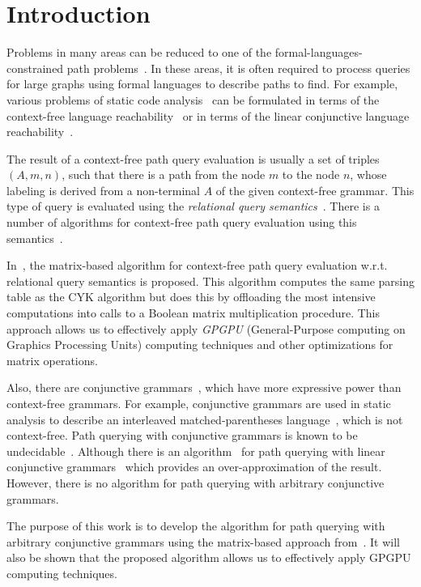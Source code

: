 \section{Introduction}

Problems in many areas can be reduced to one of the formal-languages-constrained path problems~\cite{barrett2000formal}. In these areas, it is often required to process queries for large graphs using formal languages to describe paths to find. For example, various problems of static code analysis~\cite{bastani2015specification,xu2009scaling} can be formulated in terms of the context-free language reachability~\cite{reps1998program} or in terms of the linear conjunctive language reachability~\cite{zhang2017context}.

The result of a context-free path query evaluation is usually a set of triples \mbox{$(A, m, n)$}, such that there is a path from the node $m$ to the node $n$, whose labeling is derived from a non-terminal $A$ of the given context-free grammar. This type of query is evaluated using the \emph{relational query semantics}~\cite{hellingsRelational}. There is a number of algorithms for context-free path query evaluation using this semantics~\cite{azimov2018context,GLL,hellingsRelational,GraphQueryWithEarley,RDF}.

In~\cite{azimov2018context}, the matrix-based algorithm for context-free path query evaluation w.r.t. relational query semantics is proposed. This algorithm computes the same parsing table as the CYK algorithm but does this by offloading the most intensive computations into calls to a Boolean matrix multiplication procedure. This approach allows us to effectively apply \emph{GPGPU} (General-Purpose computing on Graphics Processing Units) computing techniques and other optimizations for matrix operations.

Also, there are conjunctive grammars~\cite{okhotinConjAndBool}, which have more expressive power than context-free grammars. For example, conjunctive grammars are used in static analysis to describe an interleaved matched-parentheses language~\cite{zhang2017context}, which is not context-free. Path querying with conjunctive grammars is known to be undecidable~\cite{hellingsRelational}. Although there is an algorithm~\cite{zhang2017context} for path querying with linear conjunctive grammars~\cite{okhotinConjAndBool} which provides an over-approximation of the result. However, there is no algorithm for path querying with arbitrary conjunctive grammars.

The purpose of this work is to develop the algorithm
for path querying with arbitrary conjunctive grammars using the matrix-based approach from~\cite{azimov2018context}. It will also be shown that the proposed algorithm allows us to effectively apply GPGPU computing techniques.

